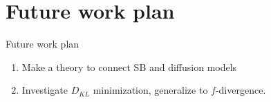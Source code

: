 \documentclass[10pt,pdf,hyperref={unicode}]{beamer}
\begin{document}
\section{Future work plan}
\begin{frame}{Future work plan}
\begin{enumerate}[1.]
    \item Make a theory to connect SB and diffusion models
    \item Investigate $D_{KL}$ minimization, generalize to $f$-divergence.
\end{enumerate}
\end{frame}




\end{document}
